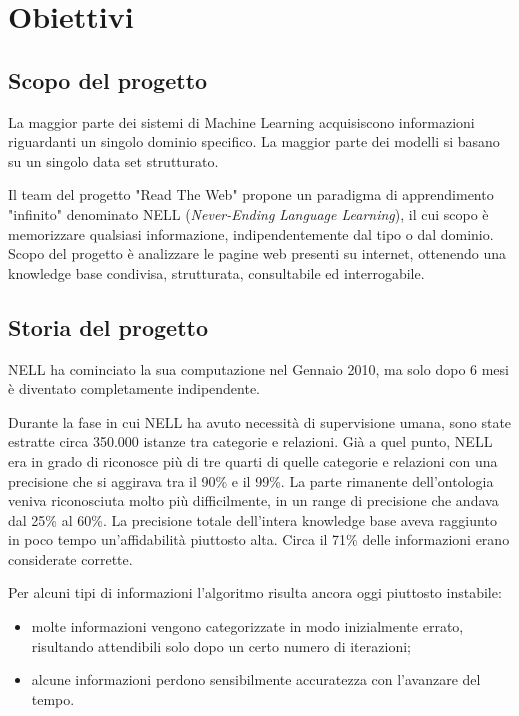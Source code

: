 \section{Obiettivi}

\subsection{Scopo del progetto}
La maggior parte dei sistemi di Machine Learning acquisiscono informazioni riguardanti un singolo dominio specifico. La maggior parte dei modelli si basano su un singolo data set strutturato.

\noindent Il team del progetto "Read The Web" propone un paradigma di apprendimento "infinito" denominato NELL (\textit{Never-Ending Language Learning}), il  cui scopo è memorizzare qualsiasi informazione, indipendentemente dal tipo o dal dominio. Scopo del progetto è analizzare le pagine web presenti su internet, ottenendo una knowledge base condivisa, strutturata, consultabile ed interrogabile.
\subsection{Storia del progetto}
NELL ha cominciato la sua computazione nel Gennaio 2010, ma solo dopo 6 mesi è diventato completamente indipendente.

\noindent Durante la fase in cui NELL ha avuto necessità di supervisione umana, sono state estratte circa 350.000 istanze tra categorie e relazioni. Già a quel punto, NELL era in grado di riconosce più di tre quarti di quelle categorie e relazioni con una precisione che si aggirava tra il 90\% e il 99\%. La parte rimanente dell'ontologia veniva riconosciuta molto più difficilmente, in un range di precisione che andava dal 25\% al 60\%. La precisione totale dell'intera knowledge base aveva raggiunto in poco tempo un'affidabilità piuttosto alta. Circa il 71\% delle informazioni erano considerate corrette.

\noindent Per alcuni tipi di informazioni l'algoritmo risulta ancora oggi piuttosto instabile:
\begin{itemize}
    \item molte informazioni vengono categorizzate in modo inizialmente errato, risultando attendibili solo dopo un certo numero di iterazioni;
    \item alcune informazioni perdono sensibilmente accuratezza con l'avanzare del tempo.
\end{itemize}

